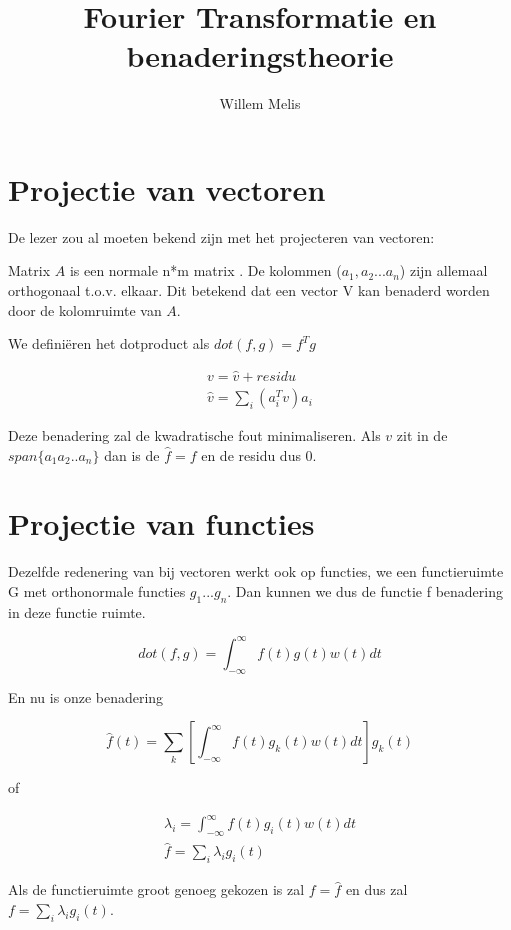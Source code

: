 \documentclass[11pt]{article} %
\title{Fourier Transformatie en benaderingstheorie}
\author{Willem Melis}
\begin{document}
\maketitle

\section{Projectie van vectoren}
De lezer zou al moeten bekend zijn met het projecteren van vectoren:

Matrix $A$ is een normale n*m matrix . De kolommen ($a_1,a_2 ... a_n$) zijn allemaal orthogonaal t.o.v. elkaar. Dit betekend dat een vector V kan benaderd worden door de kolomruimte van $A$.

We definiëren het dotproduct als $dot(f,g) = f^Tg$

\begin{eqnarray}
v =  \hat{v} + residu\\
\hat{v} = \sum_i (a_i^Tv)a_i
\end{eqnarray}
	
Deze benadering zal de kwadratische fout minimaliseren. Als $v$ zit in de $span\{a_1 a_2 .. a_n\}$ dan is de $\hat{f} =f$ en de residu dus 0.

\section{Projectie van functies}

Dezelfde redenering van bij vectoren werkt ook op functies, we een functieruimte G met orthonormale functies $g_1 ... g_n$. Dan kunnen we dus de functie f benadering in deze functie ruimte.


\begin{equation}
	dot(f,g) =  \int_{-\infty}^{\infty} f(t) g(t) w(t) dt
\end{equation}

En nu is onze benadering

\begin{equation}
\hat{f}(t) =  \sum_k [\int_{-\infty}^{\infty} f(t) g_k(t) w(t) dt]g_k(t)
\end{equation}

of

\begin{eqnarray}
\lambda_i =   \int_{-\infty}^{\infty} f(t) g_i(t) w(t)dt \\
\hat{f} = \sum_i \lambda_i g_i(t)
\end{eqnarray}

Als de functieruimte groot genoeg gekozen is zal $f=\hat{f}$ en dus zal $f = \sum_i \lambda_i g_i(t)$. 
\end{document}

